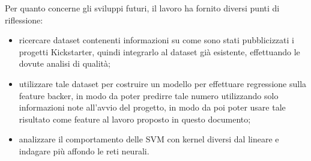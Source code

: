 Per quanto concerne gli sviluppi futuri, il lavoro ha fornito diversi punti di riflessione:\begin{itemize}
	\item ricercare dataset contenenti informazioni su come sono stati pubblicizzati i progetti Kickstarter, quindi integrarlo al dataset già esistente, effettuando le dovute analisi di qualità;
	\item utilizzare tale dataset per costruire un modello per effettuare regressione sulla feature backer, in modo da poter predirre tale numero utilizzando solo informazioni note all'avvio del progetto, in modo da poi poter usare tale risultato come feature al lavoro proposto in questo documento;
	\item analizzare il comportamento delle SVM con kernel diversi dal lineare e indagare più affondo le reti neurali.
\end{itemize}